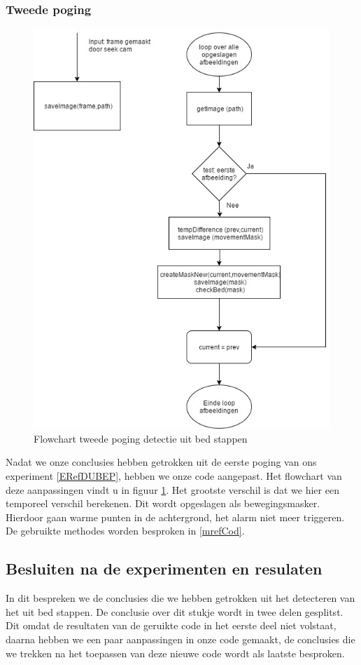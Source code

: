 \subsubsection{Tweede poging}
\label{ERefDUBTP}
\begin{figure}[hbp]
	\includegraphics[scale=0.45]{FlowChart_DetectUitBed_TweedePoging}
	\caption{Flowchart tweede poging detectie uit bed stappen}
	\label{imgFCDUBTP}
\end{figure}
Nadat we onze conclusies hebben getrokken uit de eerste poging van ons experiment \ref{ERefDUBEP}, hebben we onze code aangepast. Het flowchart van deze aanpassingen vindt u in figuur \ref{imgFCDUBTP}. Het grootste verschil is dat we hier een temporeel verschil berekenen. Dit wordt opgeslagen als bewegingsmasker. Hierdoor gaan warme punten in de achtergrond, het alarm niet meer triggeren. De gebruikte methodes worden besproken in \ref{mrefCod}.

\subsection{Besluiten na de experimenten en resulaten}
\label{ERefDBB}
In dit bespreken we de conclusies die we hebben getrokken uit het detecteren van het uit bed stappen. De conclusie over dit stukje wordt in twee delen gesplitst. Dit omdat de resultaten van de geruikte code in het eerste deel niet volstaat, daarna hebben we een paar aanpassingen in onze code gemaakt, de conclusies die we trekken na het toepassen van deze nieuwe code wordt als laatste besproken.


